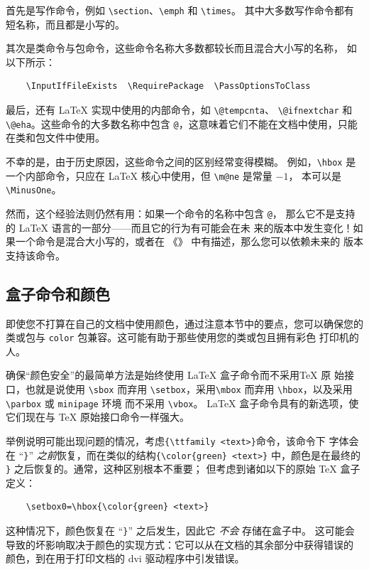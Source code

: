 \documentclass{ltxguide}[1995/11/28]
\begin{document}
首先是写作命令，例如 \verb|\section|、\verb|\emph| 和 \verb|\times|。
其中大多数写作命令都有短名称，而且都是小写的。

其次是类命令与包命令，这些命令名称大多数都较长而且混合大小写的名称，
如以下所示：
\begin{verbatim}
	\InputIfFileExists  \RequirePackage  \PassOptionsToClass
\end{verbatim}

最后，还有 \LaTeX{} 实现中使用的内部命令，如 \verb|\@tempcnta|、
\verb|\@ifnextchar| 和 \verb|\@eha|。这些命令的大多数名称中包含
\verb|@|，这意味着它们不能在文档中使用，只能在类和包文件中使用。

不幸的是，由于历史原因，这些命令之间的区别经常变得模糊。
例如，\verb|\hbox| 是一个内部命令，只应在 \LaTeX{}
核心中使用，但 \verb|\m@ne| 是常量 $-1$，
本可以是 \verb|\MinusOne|。

然而，这个经验法则仍然有用：如果一个命令的名称中包含 \verb|@|，
那么它不是支持的 \LaTeX{} 语言的一部分——而且它的行为有可能会在未
来的版本中发生变化！如果一个命令是混合大小写的，或者在
《\emph{\LaTeXbook}》 中有描述，那么您可以依赖未来的 \LaTeXe{} 版本
支持该命令。

\subsection{盒子命令和颜色}
\label{Sec:colour}

即使您不打算在自己的文档中使用颜色，通过注意本节中的要点，您可以确保您的
类或包与 \verb|color| 包兼容。这可能有助于那些使用您的类或包且拥有彩色
打印机的人。

确保“颜色安全”的最简单方法是始终使用 \LaTeX{} 盒子命令而不采用\TeX{} 原
始接口，也就是说使用 \verb|\sbox| 而弃用 \verb|\setbox|，采用\verb|\mbox|
而弃用 \verb|\hbox|，以及采用 \verb|\parbox| 或 \verb|minipage| 环境
而不采用 \verb|\vbox|。 \LaTeX{} 盒子命令具有的新选项，使它们现在与
\TeX{} 原始接口命令一样强大。

举例说明可能出现问题的情况，考虑\verb|{\ttfamily <text>}|命令，该命令下
字体会在 “\verb|}|” \emph{之前}恢复，而在类似的结构\verb|{\color{green} <text>}|
中，颜色是在最终的 \verb|}| 之后恢复的。通常，这种区别根本不重要；
但考虑到诸如以下的原始 \TeX{} 盒子定义：
\begin{verbatim}
	\setbox0=\hbox{\color{green} <text>}
\end{verbatim}
这种情况下，颜色恢复在 “\verb|}|” 之后发生，因此它 \emph{不会} 存储在盒子中。
这可能会导致的坏影响取决于颜色的实现方式：它可以从在文档的其余部分中获得错误的
颜色，到在用于打印文档的 dvi 驱动程序中引发错误。
\end{document}
